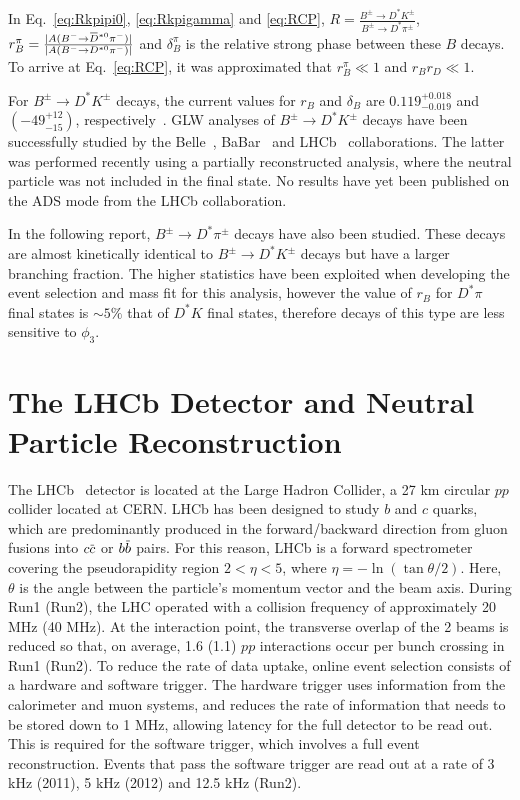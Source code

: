 \documentclass[oneside,12pt]{article}
\newcommand{\overbar}[1]{\mkern 1.5mu\overline{\mkern-1.5mu#1\mkern-1.5mu}\mkern
1.5mu}
\begin{document}
\noindent In Eq.~\eqref{eq:Rkpipi0}, \eqref{eq:Rkpigamma} and \eqref{eq:RCP},
$R=\frac{B^{\pm}\rightarrow D^* K^{\pm}}{B^{\pm}\rightarrow D^* \pi^{\pm}}$,
$r_B^{\pi}=\frac{|A(B^{-}\rightarrow
\overbar{D}^{*0}\pi^-)|}{|A(B^{-}\rightarrow {D}^{*0}\pi^-)|}$ and
$\delta_{B}^{\pi}$ is the relative strong phase between these $B$ decays. To
arrive at Eq.~\eqref{eq:RCP}, it was approximated that $r_B^{\pi}\ll 1$ and
$r_Br_D \ll 1$.

For $B^{\pm}\rightarrow D^{*}K^{\pm}$ decays, the
current values for $r_B$ and $\delta_B$ are $0.119^{+0.018}_{-0.019}$ and
$(-49^{+12}_{-15})$\degree, respectively~\cite{website:CKMFitter}. GLW analyses
of $B^{\pm}\rightarrow D^{*}K^{\pm}$ decays have been successfully studied by
the Belle~\cite{BelleGLW}, BaBar~\cite{BaBarGLW} and LHCb~\cite{PartReco}
collaborations. The latter was performed recently using a partially
reconstructed analysis, where the neutral particle was not included in the final
state. No results have yet been published on the ADS mode from the LHCb
collaboration.   

In the following report, $B^{\pm}\rightarrow D^{*}\pi^{\pm}$ decays have also
been studied. These decays are almost kinetically identical to
$B^{\pm}\rightarrow D^{*}K^{\pm}$ decays but have a larger branching fraction.
The higher statistics have been exploited when developing the event selection
and mass fit for this analysis, however the value of $r_B$ for $D^*\pi$ final
states is $\sim 5\%$ that of $D^*K$ final states, therefore decays of this
type are less sensitive to $\phi_3$.

\section{The LHCb Detector and Neutral Particle Reconstruction} \label{sec:detector}
The LHCb~\cite{LHCbDetector} detector is located at the Large Hadron Collider, a
27 km circular $pp$ collider located at CERN. LHCb has been designed to study
$b$ and $c$ quarks, which are predominantly produced in the forward/backward
direction from gluon fusions into $c\overbar{c}$ or $b\overbar{b}$ pairs. For
this reason, LHCb is a forward spectrometer covering the pseudorapidity region
$2 < \eta < 5$, where $\eta = -\ln (\tan \theta / 2)$.  Here, $\theta$ is the
angle between the particle's momentum vector and the beam axis. During Run1
(Run2), the LHC operated with a collision frequency of approximately 20 MHz (40
MHz). At the interaction point, the transverse overlap of the 2 beams is reduced
so that, on average, 1.6 (1.1) $pp$ interactions occur per bunch crossing in
Run1 (Run2). To reduce the rate of data uptake, online event selection consists
of a hardware and software trigger. The hardware trigger uses information from
the calorimeter and muon systems, and reduces the rate of information that needs
to be stored down to 1 MHz, allowing latency for the full detector to be read
out. This is required for the software trigger, which involves a full event
reconstruction.  Events that pass the software trigger are read out at a rate of
3 kHz (2011), 5 kHz (2012) and 12.5 kHz (Run2).
\end{document}
